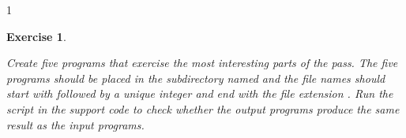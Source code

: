 \documentclass[7x10]{TimesAPriori_MIT}%
\def\pythonEd{1}
\def\edition{1}
\newtheorem{exercise}[theorem]{Exercise}
\begin{document}
{\if\edition\pythonEd
\begin{exercise}
\normalfont %
\label{ex:Lvar}

Create five \LangVar{} programs that exercise the most interesting
parts of the  pass.  The five programs
should be placed in the subdirectory named  and the file
names should start with  followed by a unique
integer and end with the file extension .
Run the  script in the support code to check
whether the output programs produce the same result as the input
programs.
\end{exercise}

\fi}
\end{document}
